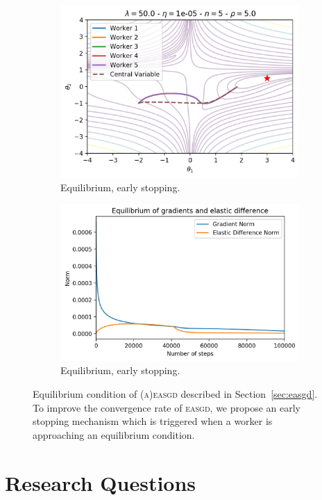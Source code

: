 \begin{figure}[H]
\begin{subfigure}{.49\textwidth}
    \includegraphics[width=\linewidth]{resources/images/easgd_es_50_y}
    \caption{Equilibrium, early stopping.}
  \end{subfigure}
  \begin{subfigure}{.49\textwidth}
    \centering
    \includegraphics[width=\linewidth]{resources/images/easgd_es_50_y_eq}
    \caption{Equilibrium, early stopping.}
  \end{subfigure}
  \caption{Equilibrium condition of \textsc{(a)easgd} described in Section~\ref{sec:easgd}. To improve the convergence rate of \textsc{easgd}, we propose an early stopping mechanism which is triggered when a worker is approaching an equilibrium condition.}
  \label{fig:conclusion_equilibrium_early_stopping}
\end{figure}

\section{Research Questions}
\label{sec:conclusion_research_questions}

